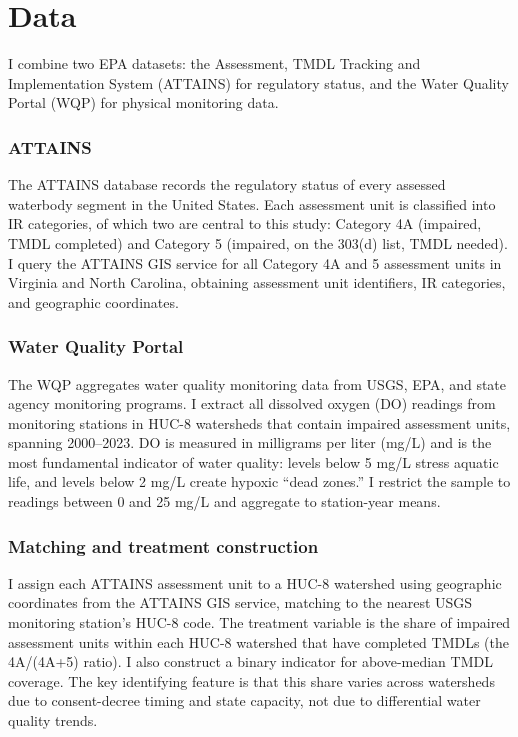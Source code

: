 \documentclass[12pt]{article}
\begin{document}
\section{Data}
\label{sec:data}

I combine two EPA datasets: the Assessment, TMDL Tracking and Implementation System (ATTAINS) for regulatory status, and the Water Quality Portal (WQP) for physical monitoring data.

\subsubsection*{ATTAINS} The ATTAINS database records the regulatory status of every assessed waterbody segment in the United States. Each assessment unit is classified into IR categories, of which two are central to this study: Category 4A (impaired, TMDL completed) and Category 5 (impaired, on the 303(d) list, TMDL needed). I query the ATTAINS GIS service for all Category 4A and 5 assessment units in Virginia and North Carolina, obtaining assessment unit identifiers, IR categories, and geographic coordinates.

\subsubsection*{Water Quality Portal} The WQP aggregates water quality monitoring data from USGS, EPA, and state agency monitoring programs. I extract all dissolved oxygen (DO) readings from monitoring stations in HUC-8 watersheds that contain impaired assessment units, spanning 2000--2023. DO is measured in milligrams per liter (mg/L) and is the most fundamental indicator of water quality: levels below 5 mg/L stress aquatic life, and levels below 2 mg/L create hypoxic ``dead zones.'' I restrict the sample to readings between 0 and 25 mg/L and aggregate to station-year means.

\subsubsection*{Matching and treatment construction} I assign each ATTAINS assessment unit to a HUC-8 watershed using geographic coordinates from the ATTAINS GIS service, matching to the nearest USGS monitoring station's HUC-8 code. The treatment variable is the share of impaired assessment units within each HUC-8 watershed that have completed TMDLs (the 4A/(4A+5) ratio). I also construct a binary indicator for above-median TMDL coverage. The key identifying feature is that this share varies across watersheds due to consent-decree timing and state capacity, not due to differential water quality trends.
\end{document}
